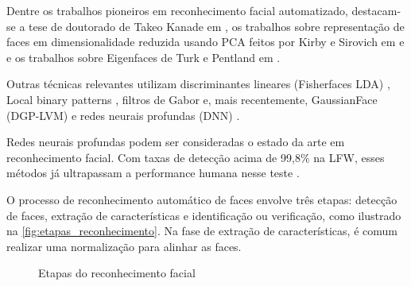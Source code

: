 Dentre os trabalhos pioneiros em reconhecimento facial automatizado, destacam-se a tese de doutorado de Takeo Kanade em \citeyear{kanade1973picture}, os trabalhos sobre representação de faces em dimensionalidade reduzida usando PCA feitos por Kirby e Sirovich em \citeyear{sirovich1987low} e \citeyear{kirby1990application} e os trabalhos sobre Eigenfaces de Turk e Pentland em \citeyear{turk1991eigenfaces}.

Outras técnicas relevantes utilizam discriminantes lineares (Fisherfaces LDA) \cite{belhumeur1997eigenfaces, etemad1996face}, Local binary patterns \cite{ojala1994performance}, filtros de Gabor \cite{lades1993distortion, wiskott1997face, gonccalves2016robusto} e, mais recentemente, GaussianFace (DGP-LVM) \cite{lu2015surpassing} e redes neurais profundas (DNN) \cite{taigman2014deepface, he2015delving, sun2014deep, sun2014predict, sun2015deeply, zhu2014recover, schroff2015facenet, zhou2015naive, yi2014learning, sun2015deepid3, amos2016openface}.

Redes neurais profundas podem ser consideradas o estado da arte em reconhecimento facial. Com taxas de detecção acima de 99,8\% na LFW, esses métodos já ultrapassam a performance humana nesse teste \cite{learned2016labeled, kumar2009attribute}.

O processo de reconhecimento automático de faces envolve três etapas: detecção de faces, extração de características e identificação ou verificação, como ilustrado na \autoref{fig:etapas_reconhecimento}. Na fase de extração de características, é comum realizar uma normalização para alinhar as faces.

\begin{figure}[htbp]
    \caption{Etapas do reconhecimento facial}
    \label{fig:etapas_reconhecimento}
    \begin{adjustbox}{max width=\textwidth}
    \end{adjustbox}
\end{figure}

